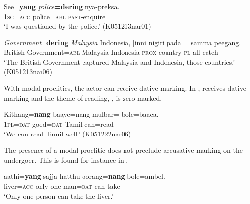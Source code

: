  


\ea \label{ex:pred:argstr:2:instracc}
\gll See=\textbf{yang} {\em police}\textbf{=dering} nya-preksa. \\
     1\textsc{sg}=\textsc{acc} police=\textsc{abl} \textsc{past}-enquire  \\
    `I was questioned by the police.' (K051213nar01)
\z

 

\ea \label{ex:pred:argstr:2:instrzero}
  {\em Government}=\textbf{dering}   {\em Malaysia} Indonesia,  [inni nigiri pada]=\zero{}    samma peegang. \\
    British Government=\textsc{abl}  Malaysia Indonesia \textsc{prox} country \textsc{pl}  all catch\\
   `The British Government captured Malaysia and Indonesia,  those countries.' (K051213nar06)
\z

With modal proclitics, the actor can receive dative marking. In ,  receives dative marking and the theme of reading, , is zero-marked.


\ea \label{ex:pred:argstr:2:zerodat:baaca}
\gll Kithang=\textbf{nang} baaye=nang mulbar=\zero{} bole=baaca. \\
      1\textsc{pl}=\textsc{dat} good=\textsc{dat} Tamil can=read \\
    `We can read Tamil well.'  (K051222nar06)
\z      


The presence of a  modal proclitic does not preclude accusative marking on the undergoer. This is found for instance in .



\ea \label{ex:pred:argstr:2:accdat:aathi}
\gll   aathi=\textbf{yang} sajja hatthu oorang=\textbf{nang} bole=ambel. \\
        liver=\textsc{acc} only one man=\textsc{dat} can-take \\
    `Only one person can take the liver.'
\z

 

% 

